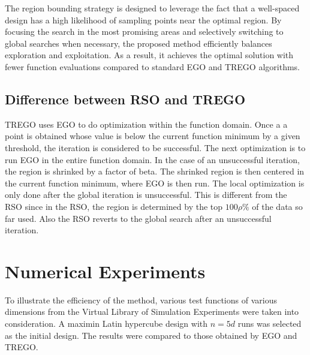 \documentclass [PhD] {package/uclathes}
\begin{document}
The region bounding strategy is designed to leverage the fact that a well-spaced design has a high likelihood of sampling points near the optimal region. By focusing the search in the most promising areas and selectively switching to global searches when necessary, the proposed method efficiently balances exploration and exploitation. As a result, it achieves the optimal solution with fewer function evaluations compared to standard EGO and TREGO algorithms.

\subsection{Difference between RSO and TREGO}
TREGO uses EGO to do optimization within the function domain. Once a a point is obtained whose value is below the current function minimum by a given threshold, the iteration is considered to be successful. The next optimization is to run EGO  in the entire function domain. In the case of an unsuccessful iteration, the region is shrinked by a factor of beta. The shrinked region is then centered in the current function minimum, where EGO is then run. The local optimization is only done after the global iteration is unsuccessful. This is different from the RSO since in the RSO, the region is determined by the top $100\rho\%$ of the data so far used. Also the RSO reverts to the global search after an unsuccessful iteration.


\section{Numerical Experiments}
To illustrate the efficiency of the method, various test functions of various dimensions from the Virtual Library of Simulation Experiments \parencite{simulationlib} were taken into consideration. A maximin Latin hypercube design with $n=5d$ runs was selected as the initial design. The results were compared to those obtained by EGO and TREGO.
\end{document}
